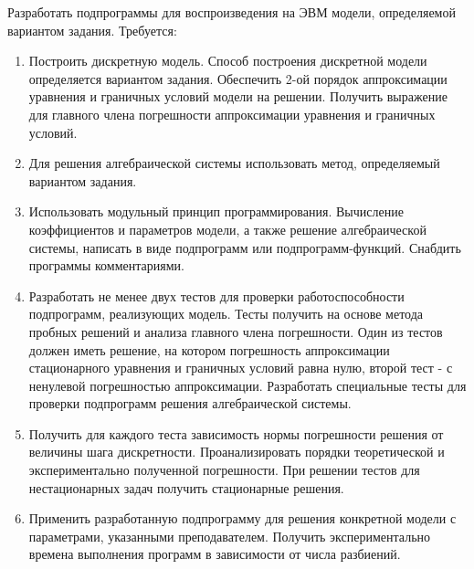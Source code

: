Разработать подпрограммы для воспроизведения
на ЭВМ модели, определяемой вариантом задания. Требуется:
\begin{enumerate}
  \item Построить дискретную модель. Способ построения
  дискретной модели определяется вариантом задания. Обеспечить
  2-ой порядок аппроксимации уравнения и граничных условий модели
  на решении. Получить выражение для главного члена погрешности
  аппроксимации уравнения и граничных условий.

  \item Для решения алгебраической системы использовать метод,
  определяемый вариантом задания.

  \item Использовать модульный принцип программирования. Вычисление
  коэффициентов и параметров модели, а также решение алгебраической
  системы, написать в виде подпрограмм или подпрограмм-функций. Снабдить
  программы комментариями.

  \item Разработать не менее двух тестов для проверки работоспособности
  подпрограмм, реализующих модель. Тесты получить на основе метода пробных
  решений и анализа главного члена погрешности. Один из тестов должен
  иметь решение, на котором погрешность аппроксимации стационарного уравнения
  и граничных условий равна нулю, второй тест - с ненулевой погрешностью
  аппроксимации. Разработать специальные тесты для проверки подпрограмм решения
  алгебраической системы.

  \item Получить для каждого теста зависимость нормы погрешности решения
  от величины шага дискретности. Проанализировать порядки теоретической и
  экспериментально полученной погрешности. При решении тестов для нестационарных
  задач получить стационарные решения.

  \item Применить разработанную подпрограмму для решения конкретной модели
  с параметрами, указанными преподавателем. Получить экспериментально времена
  выполнения программ в зависимости от числа разбиений.
\end{enumerate}
